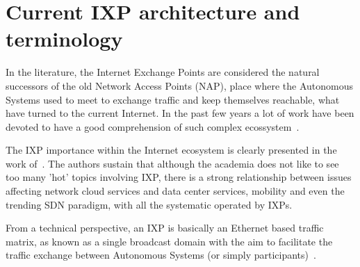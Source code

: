 \documentclass[conference]{IEEEtran/IEEEtran}
\begin{document}
\section{Current IXP architecture and terminology}
\label{ixp_intro}

In the literature, the Internet Exchange Points are considered the natural successors of the old Network Access Points (NAP), place where the Autonomous Systems used to meet to exchange traffic and keep themselves reachable, what have turned to the current Internet. In the past few years a lot of work have been devoted to have a good comprehension of such complex ecossystem~\cite{haddadi2013}.

The IXP importance within the Internet ecosystem is clearly presented in the work of~\cite{chatzis2013importance}. The authors sustain that although the academia does not like to see too many 'hot' topics involving IXP, there is a strong relationship between issues affecting network cloud services and data center services, mobility and even the trending SDN paradigm, with all the systematic operated by IXPs.

From a technical perspective, an IXP is basically an Ethernet based traffic matrix, as known as a single broadcast domain with the aim to facilitate the traffic exchange between Autonomous Systems (or simply participants)~\cite{euroix2012}.



\end{document}
